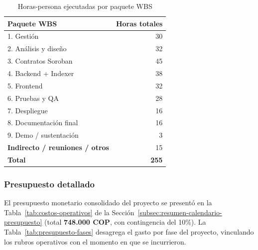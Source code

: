 \documentclass[12pt,oneside]{report}
\begin{document}
      \begin{table}[H]
        \centering
        \begin{tabular}{@{}l r@{}}
          \toprule
          \textbf{Paquete WBS} & \textbf{Horas totales}\\
          \midrule
          1. Gestión & 30\\
          2. Análisis y diseño & 32\\
          3. Contratos Soroban & 45\\
          4. Backend + Indexer & 38\\
          5. Frontend & 32\\
          6. Pruebas y QA & 28\\
          7. Despliegue & 16\\
          8. Documentación final & 16\\
          9. Demo / sustentación & 3\\
          \midrule
          \textbf{Indirecto / reuniones / otros} & 15\\
          \midrule
          \textbf{Total} & \textbf{255}\\
          \bottomrule
        \end{tabular}
        \caption{Horas-persona ejecutadas por paquete WBS}
        \label{tab:horas-paquete}
      \end{table}

      \subsubsection{Presupuesto detallado}
      \label{subsubsec:presupuesto-detallado}
      El presupuesto monetario consolidado del proyecto se presentó en la Tabla~\ref{tab:costos-operativos} de la Sección~\ref{subsec:resumen-calendario-presupuesto} (total \textbf{748.000 COP}, con contingencia del 10\%). La Tabla~\ref{tab:presupuesto-fases} desagrega el gasto por fase del proyecto, vinculando los rubros operativos con el momento en que se incurrieron.
\end{document}
